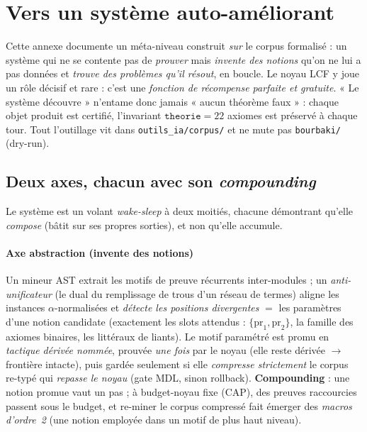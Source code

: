 \section{Vers un système auto-améliorant}

Cette annexe documente un méta-niveau construit \emph{sur} le corpus formalisé :
un système qui ne se contente pas de \emph{prouver} mais \emph{invente des
notions} qu'on ne lui a pas données et \emph{trouve des problèmes qu'il résout},
en boucle. Le noyau LCF y joue un rôle décisif et rare : c'est une \emph{fonction
de récompense parfaite et gratuite}. « Le système découvre » n'entame donc jamais
« aucun théorème faux » : chaque objet produit est certifié, l'invariant
$\texttt{theorie}=22$ axiomes est préservé à chaque tour. Tout l'outillage vit
dans \texttt{outils\_ia/corpus/} et ne mute pas \texttt{bourbaki/} (dry-run).

\subsection{Deux axes, chacun avec son \emph{compounding}}

Le système est un volant \emph{wake-sleep} à deux moitiés, chacune démontrant
qu'elle \emph{compose} (bâtit sur ses propres sorties), et non qu'elle accumule.

\paragraph{Axe abstraction (invente des notions)} Un mineur AST extrait les motifs
de preuve récurrents inter-modules ; un \emph{anti-unificateur} (le dual du
remplissage de trous d'un réseau de termes) aligne les instances $\alpha$-normalisées
et \emph{détecte les positions divergentes} $=$ les paramètres d'une notion candidate
(exactement les slots attendus : $\{\mathrm{pr}_1,\mathrm{pr}_2\}$, la famille des
axiomes binaires, les littéraux de liants). Le motif paramétré est promu en
\emph{tactique dérivée nommée}, prouvée \emph{une fois} par le noyau (elle reste
dérivée $\to$ frontière intacte), puis gardée seulement si elle \emph{compresse
strictement} le corpus re-typé qui \emph{repasse le noyau} (gate MDL, sinon
rollback). \textbf{Compounding} : une notion promue vaut un pas ; à budget-noyau
fixe (CAP), des preuves raccourcies passent sous le budget, et re-miner le corpus
compressé fait émerger des \emph{macros d'ordre~2} (une notion employée dans un
motif de plus haut niveau).

